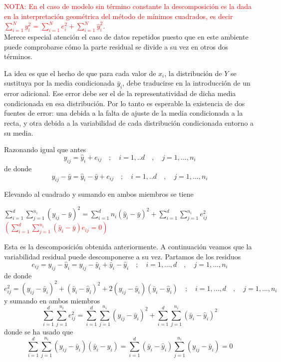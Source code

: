 \documentclass[10pt,a4paper]{book}
\begin{document}
\textcolor{red}{NOTA: En el caso de modelo sin término constante la descomposición es la dada en la interpretación geométrica del método de mínimos cuadrados, es decir $\displaystyle\sum^N_{i=1}y^2_i=\displaystyle\sum^N_{i=1}e^2_i+\displaystyle\sum^N_{i=1}\widehat{y}^2_i$.}
\ \\

Merece especial atención el caso de datos repetidos puesto que en este ambiente puede comprobarse cómo la parte residual se divide a su vez en otros dos términos.

La idea es que el hecho de que para cada valor de $x_i$, la distribución de $Y$ se sustituya por la media condicionada $\bar{y}_i$, debe traducirse en la introducción de un error adicional. Ese error debe ser el de la representatividad de dicha media condicionada en esa distribución. Por lo tanto es esperable la existencia de dos fuentes de error: una debida a la falta de ajuste de la media condicionada a la recta, y otra debida a la variabilidad de cada distribución condicionada entorno a su media.

Razonando igual que antes $$y_{ij}=\widehat{y}_i+e_{ij}\quad ; \quad i=1,..d\quad , \quad j=1,...,n_i$$ de donde $$y_{ij}-\bar{y}=\widehat{y}_i-\bar{y}+e_{ij}\quad ; \quad i=1,..d\quad , \quad j=1,...,n_i$$

Elevando al cuadrado y sumando en ambos miembros se tiene
\begin{center}
$\displaystyle\sum^d_{i=1}\displaystyle\sum^{n_i}_{j=1}(y_{ij}-\bar{y})^2=\displaystyle\sum^d_{i=1}n_i(\widehat{y}_i-\bar{y})^2+\displaystyle\sum^d_{i=1}\displaystyle\sum^{n_i}_{j=1}e^2_{ij}\quad$ \textcolor{red}{$\left(\displaystyle\sum^d_{i=1}\displaystyle\sum^{n_i}_{j=1}(\widehat{y}_i-\bar{y})e_{ij}=0\right) $}
\end{center}

Esta es la descomposición obtenida anteriormente. A continuación veamos que la variabilidad residual puede descomponerse a su vez. Partamos de los residuos $$e_{ij}=y_{ij}-\widehat{y}_i=y_{ij}-\bar{y}_i+\bar{y}_i-\widehat{y}_i\quad ;\quad i=1,...,d\quad ,\quad j=1,...,n_i$$ de donde $$e^2_{ij}=(y_{ij}-\bar{y}_i)^2+(\bar{y}_i-\widehat{y}_i)^2+2(y_{ij}-\bar{y}_i)(\bar{y}_i-\widehat{y}_i)\quad ;\quad i=1,...,d\quad ,\quad j=1,...,n_i$$ y sumando en ambos miembros $$\sum^d_{i=1}\sum^{n_i}_{j=1}e^2_{ij}=\sum^d_{i=1}\sum^{n_i}_{j=1}(y_{ij}-\bar{y}_i)^2+\sum^d_{i=1}\sum^{n_i}_{j=1}(\bar{y}_i-\widehat{y}_i)^2$$ donde se ha usado que $$\sum^d_{i=1}\sum^{n_i}_{j=1}(y_{ij}-\bar{y}_i)(\bar{y}_i-\widehat{y}_i)=\sum^d_{i=1}(\bar{y}_i-\widehat{y}_i)\sum^{n_i}_{j=1}(y_{ij}-\bar{y}_i)=0$$
\end{document}
